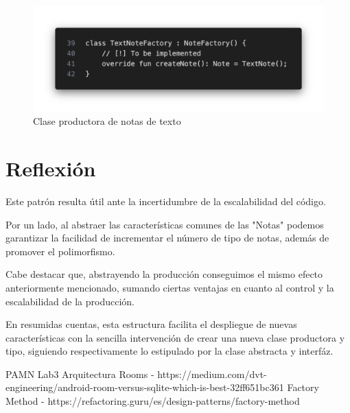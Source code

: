 \documentclass{article}
\begin{document}
        \begin{figure}[H]
            \centerline{\includegraphics[scale=0.3]{text_note_factory.png}}
            \caption{Clase productora de notas de texto}
            \label{fig:text_note_factory}
        \end{figure}

    \section{Reflexión}
    Este patrón resulta útil ante la incertidumbre de la escalabilidad del código.
    
    Por un lado, al abstraer las características comunes de las "Notas" podemos garantizar la
     facilidad de incrementar el número de tipo de notas, además de promover el polimorfismo.

    Cabe destacar que, abstrayendo la producción conseguimos el mismo efecto anteriormente mencionado,
     sumando ciertas ventajas en cuanto al control y la escalabilidad de la producción.
    
    En resumidas cuentas, esta estructura facilita el despliegue de nuevas características con
     la sencilla intervención de crear una nueva clase productora y tipo, siguiendo respectivamente
     lo estipulado por la clase abstracta y interfáz.

    \begin{thebibliography}{}
         PAMN Lab3 Arquitectura
         Rooms - https://medium.com/dvt-engineering/android-room-versus-sqlite-which-is-best-32ff651bc361
         Factory Method - https://refactoring.guru/es/design-patterns/factory-method
    \end{thebibliography}
        
\end{document}

